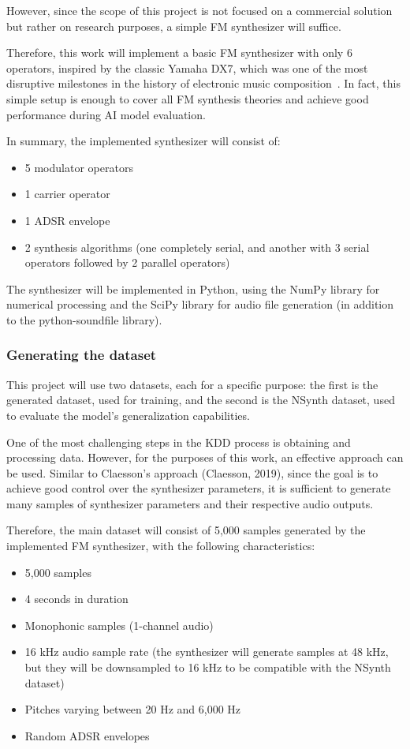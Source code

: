 \documentclass[sigconf,natbib=false]{acmart}
\begin{document}
However, since the scope of this project is not focused on a commercial solution but rather on research purposes, a simple FM synthesizer will suffice.

Therefore, this work will implement a basic FM synthesizer with only 6 operators, inspired by the classic Yamaha DX7, which was one of the most disruptive milestones in the history of electronic music composition~\cite{TODO}. In fact, this simple setup is enough to cover all FM synthesis theories and achieve good performance during AI model evaluation.

In summary, the implemented synthesizer will consist of:

\begin{itemize}
\item 5 modulator operators
\item 1 carrier operator
\item 1 ADSR envelope
\item 2 synthesis algorithms (one completely serial, and another with 3 serial operators followed by 2 parallel operators)
\end{itemize}

The synthesizer will be implemented in Python, using the NumPy library for numerical processing and the SciPy library for audio file generation (in addition to the python-soundfile library).

\subsubsection{Generating the dataset}

This project will use two datasets, each for a specific purpose: the first is the generated dataset, used for training, and the second is the NSynth dataset, used to evaluate the model's generalization capabilities.

One of the most challenging steps in the KDD process is obtaining and processing data. However, for the purposes of this work, an effective approach can be used. Similar to Claesson's approach (Claesson, 2019), since the goal is to achieve good control over the synthesizer parameters, it is sufficient to generate many samples of synthesizer parameters and their respective audio outputs.

Therefore, the main dataset will consist of 5,000 samples generated by the implemented FM synthesizer, with the following characteristics:

\begin{itemize}
\item 5,000 samples
\item 4 seconds in duration
\item Monophonic samples (1-channel audio)
\item 16 kHz audio sample rate (the synthesizer will generate samples at 48 kHz, but they will be downsampled to 16 kHz to be compatible with the NSynth dataset)
\item Pitches varying between 20 Hz and 6,000 Hz
\item Random ADSR envelopes
\end{itemize}
\end{document}
